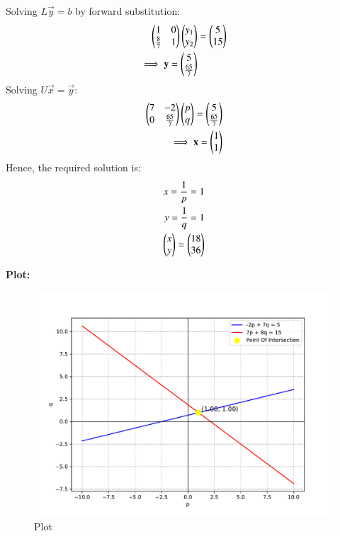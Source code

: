 \documentclass[journal]{IEEEtran}
\begin{document}
Solving $L\vec{y} = b$ by forward substitution:
\begin{align}
    \begin{pmatrix}1 & 0 \\ \frac{8}{7} & 1\end{pmatrix}\begin{pmatrix}y_1\\y_2\end{pmatrix}&=\begin{pmatrix} 5 \\ 15\end{pmatrix}\\
    \implies \mathbf{y} = \begin{pmatrix}5 \\ \frac{65}{7}\end{pmatrix}
\end{align}
Solving $U\vec{x} = \vec{y}$:
\begin{align}
    \begin{pmatrix}7 & -2\\0 & \frac{65}{7}\end{pmatrix}\begin{pmatrix}p \\ q\end{pmatrix} = \begin{pmatrix}5 \\ \frac{65}{7}\end{pmatrix}\\
    \implies \mathbf{x} = \begin{pmatrix}1 \\ 1\end{pmatrix}
\end{align}
Hence, the required solution is:
\begin{align}
    x = \frac{1}{p} = 1 \\
    y = \frac{1}{q} = 1\\
    \begin{pmatrix}x\\y\end{pmatrix}=\begin{pmatrix}18\\36\end{pmatrix}
\end{align}

\newpage

\textbf{Plot:}\\
\begin{figure}[h]
	\centering
	\includegraphics[width=\columnwidth]{figs/fig.pdf}
	\caption{Plot}
\end{figure}
\end{document}
